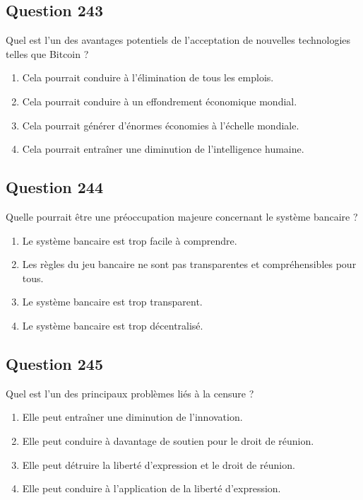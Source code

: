 \documentclass[12pt,a4paper]{article}
\begin{document}
\bigskip


\subsection*{Question 243}
Quel est l'un des avantages potentiels de l'acceptation de nouvelles technologies telles que Bitcoin ?

\begin{enumerate}[label=\Alph*., leftmargin=*]
\item Cela pourrait conduire à l'élimination de tous les emplois.
\item Cela pourrait conduire à un effondrement économique mondial.
\item Cela pourrait générer d'énormes économies à l'échelle mondiale.
\item Cela pourrait entraîner une diminution de l'intelligence humaine.
\end{enumerate}

\bigskip


\subsection*{Question 244}
Quelle pourrait être une préoccupation majeure concernant le système bancaire ?

\begin{enumerate}[label=\Alph*., leftmargin=*]
\item Le système bancaire est trop facile à comprendre.
\item Les règles du jeu bancaire ne sont pas transparentes et compréhensibles pour tous.
\item Le système bancaire est trop transparent.
\item Le système bancaire est trop décentralisé.
\end{enumerate}

\bigskip


\subsection*{Question 245}
Quel est l'un des principaux problèmes liés à la censure ?

\begin{enumerate}[label=\Alph*., leftmargin=*]
\item Elle peut entraîner une diminution de l'innovation.
\item Elle peut conduire à davantage de soutien pour le droit de réunion.
\item Elle peut détruire la liberté d'expression et le droit de réunion.
\item Elle peut conduire à l'application de la liberté d'expression.
\end{enumerate}
\end{document}
